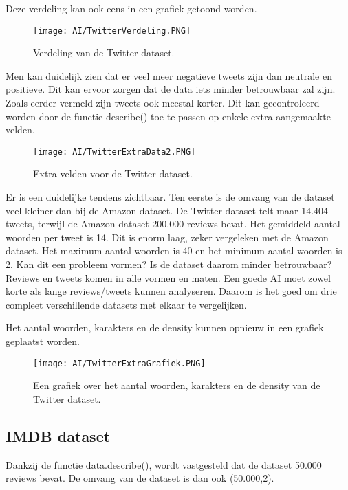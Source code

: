 Deze verdeling kan ook eens in een grafiek getoond worden.

\begin{figure}[!htbp]
    \texttt{[image: AI/TwitterVerdeling.PNG]}
    \caption{\label{twittergrafiek}Verdeling van de Twitter dataset.}
\end{figure}
\FloatBarrier

Men kan duidelijk zien dat er veel meer negatieve tweets zijn dan neutrale en positieve. Dit kan ervoor zorgen dat de data iets minder betrouwbaar zal zijn. Zoals eerder vermeld zijn tweets ook meestal korter. Dit kan gecontroleerd worden door de functie describe() toe te passen op enkele extra aangemaakte velden.

\begin{figure}[!htbp]
    \texttt{[image: AI/TwitterExtraData2.PNG]}
    \caption{\label{twitterextradata}Extra velden voor de Twitter dataset.}
\end{figure}
\FloatBarrier

Er is een duidelijke tendens zichtbaar. Ten eerste is de omvang van de dataset veel kleiner dan bij de Amazon dataset. De Twitter dataset telt maar 14.404 tweets, terwijl de Amazon dataset 200.000 reviews bevat. Het gemiddeld aantal woorden per tweet is 14. Dit is enorm laag, zeker vergeleken met de Amazon dataset. Het maximum aantal woorden is 40 en het minimum aantal woorden is 2. 
Kan dit een probleem vormen? Is de dataset daarom minder betrouwbaar? Reviews en tweets komen in alle vormen en maten. Een goede AI moet zowel korte als lange reviews/tweets kunnen analyseren. Daarom is het goed om drie compleet verschillende datasets met elkaar te vergelijken. 

Het aantal woorden, karakters en de density kunnen opnieuw in een grafiek geplaatst worden.

\begin{figure}[!htbp]
    \texttt{[image: AI/TwitterExtraGrafiek.PNG]}
    \caption{\label{twitterextragrafiek}Een grafiek over het aantal woorden, karakters en de density van de Twitter dataset.}
\end{figure}
\FloatBarrier

\subsection{IMDB dataset}
Dankzij de functie data.describe(), wordt vastgesteld dat de dataset 50.000 reviews bevat. De omvang van de dataset is dan ook (50.000,2).

